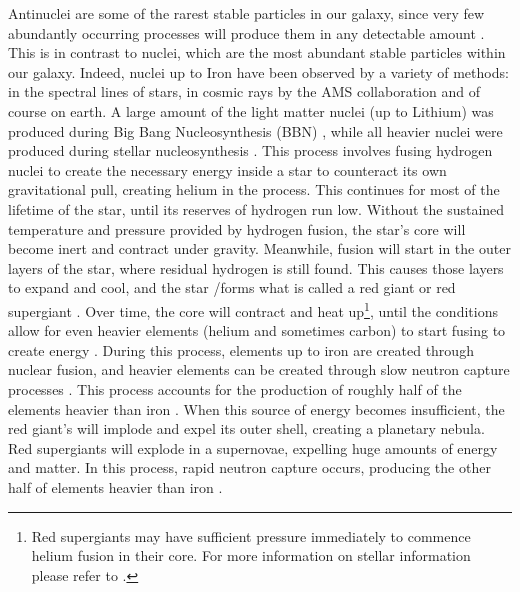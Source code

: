 Antinuclei are some of the rarest stable particles in our galaxy, since very few abundantly occurring processes will produce them in any detectable amount \cite{Poulin_AMS_ahe_events, Coogan_2017}. This is in contrast to nuclei, which are the most abundant stable particles within our galaxy. Indeed, nuclei up to Iron have been observed by a variety of methods: in the spectral lines of stars, in cosmic rays by the AMS collaboration \cite{AMS_B_to_C} and of course on earth. A large amount of the light matter nuclei (up to Lithium) was produced during Big Bang Nucleosynthesis (BBN) \cite{PDG2022}, while all heavier nuclei were produced during stellar nucleosynthesis \cite{stellar_evo_nucleosynthesis}. This process involves fusing hydrogen nuclei to create the necessary energy inside a star to counteract its own gravitational pull, creating helium in the process. This continues for most of the lifetime of the star, until its reserves of hydrogen run low. Without the sustained temperature and pressure provided by hydrogen fusion, the star's core will become inert and contract under gravity. Meanwhile, fusion will start in the outer layers of the star, where residual hydrogen is still found. This causes those layers to expand and cool, and the star /forms what is called a red giant \cite{stellar_evo_nucleosynthesis} or red supergiant \cite{stellar_evo_nucleosynthesis}. Over time, the core will contract and heat up\footnote{Red supergiants may have sufficient pressure immediately to commence helium fusion in their core. For more information on stellar information please refer to \cite{stellar_evo_nucleosynthesis}.}, until the conditions allow for even heavier elements (helium and sometimes carbon) to start fusing to create energy \cite{stellar_evo_nucleosynthesis}. During this process, elements up to iron are created through nuclear fusion, and heavier elements can be created through slow neutron capture processes \cite{stellar_evo_nucleosynthesis}. This process accounts for the production of roughly half of the elements heavier than iron \cite{stellar_evo_nucleosynthesis}. When this source of energy becomes insufficient, the red giant's will implode and expel its outer shell, creating a planetary nebula. Red supergiants will explode in a supernovae, expelling huge amounts of energy and matter. In this process, rapid neutron capture occurs, producing the other half of elements heavier than iron \cite{Supernovae_nucleosynthesis}. \\
